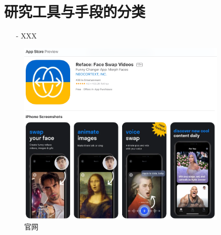 \chapter{研究工具与手段的分类}
\label{chap:2}



\begin{itemize}
\item [-] XXX
\end{itemize}


\begin{figure}[htb]
\centering 
\includegraphics[width=0.90\textwidth]{img/ch1m1.png} 
\caption{官网}
\label{Test}
\end{figure}
